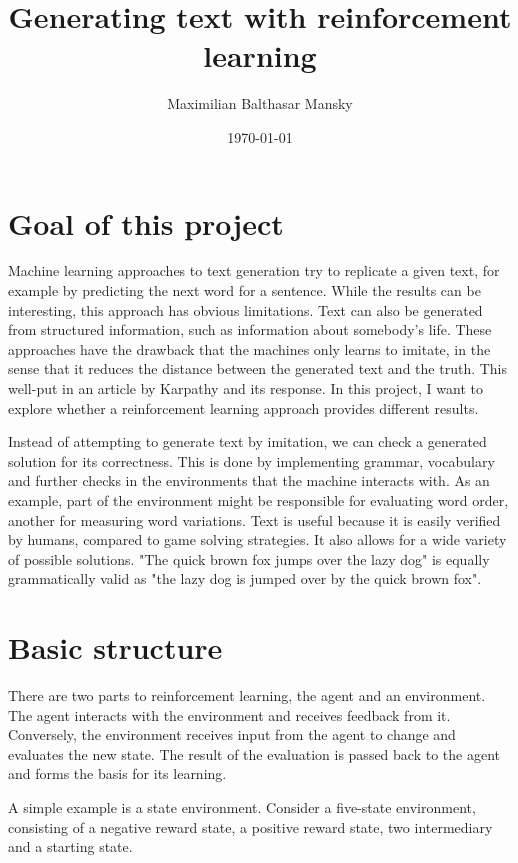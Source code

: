 \documentclass[a4paper, justified]{tufte-handout}
\title{Generating text with reinforcement learning}
\author{Maximilian Balthasar Mansky}
\date{\today}
\begin{document}
\maketitle

\section{Goal of this project}

Machine learning approaches to text generation try to replicate a given text, for example by predicting the next word for a sentence. While the results can be interesting, this approach has obvious limitations.\cite{lau2020} Text can also be generated from structured information, such as information about somebody's life.\cite{lebret2010} These approaches have the drawback that the machines only learns to imitate, in the sense that it reduces the distance between the generated text and the truth. This well-put in an article by Karpathy\cite{karpathy2015} and its response\cite{goldberg2015}. In this project, I want to explore whether a reinforcement learning approach provides different results.

Instead of attempting to generate text by imitation, we can check a generated solution for its correctness. This is done by implementing grammar, vocabulary and further checks in the environments that the machine interacts with. As an example, part of the environment might be responsible for evaluating word order, another for measuring word variations. Text is useful because it is easily verified by humans, compared to game solving strategies. It also allows for a wide variety of possible solutions. "The quick brown fox jumps over the lazy dog" is equally grammatically valid as "the lazy dog is jumped over by the quick brown fox".

\section{Basic structure}

There are two parts to reinforcement learning, the agent and an environment. The agent interacts with the environment and receives feedback from it. Conversely, the environment receives input from the agent to change and evaluates the new state. The result of the evaluation is passed back to the agent and forms the basis for its learning.

A simple example is a state environment. Consider a five-state environment, consisting of a negative reward state, a positive reward state, two intermediary and a starting state. 
\end{document}
